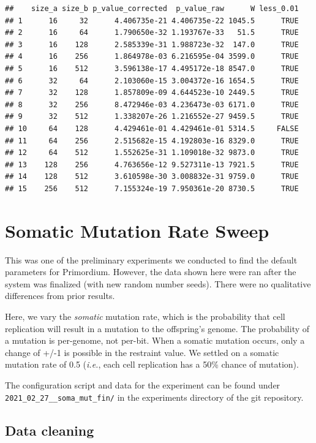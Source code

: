 \documentclass[
]{book}
\begin{document}
\begin{verbatim}
##    size_a size_b p_value_corrected  p_value_raw      W less_0.01
## 1      16     32      4.406735e-21 4.406735e-22 1045.5      TRUE
## 2      16     64      1.790650e-32 1.193767e-33   51.5      TRUE
## 3      16    128      2.585339e-31 1.988723e-32  147.0      TRUE
## 4      16    256      1.864978e-03 6.216595e-04 3599.0      TRUE
## 5      16    512      3.596138e-17 4.495172e-18 8547.0      TRUE
## 6      32     64      2.103060e-15 3.004372e-16 1654.5      TRUE
## 7      32    128      1.857809e-09 4.644523e-10 2449.5      TRUE
## 8      32    256      8.472946e-03 4.236473e-03 6171.0      TRUE
## 9      32    512      1.338207e-26 1.216552e-27 9459.5      TRUE
## 10     64    128      4.429461e-01 4.429461e-01 5314.5     FALSE
## 11     64    256      2.515682e-15 4.192803e-16 8329.0      TRUE
## 12     64    512      1.552625e-31 1.109018e-32 9873.0      TRUE
## 13    128    256      4.763656e-12 9.527311e-13 7921.5      TRUE
## 14    128    512      3.610598e-30 3.008832e-31 9759.0      TRUE
## 15    256    512      7.155324e-19 7.950361e-20 8730.5      TRUE
\end{verbatim}

\hypertarget{somatic-mutation-rate-sweep}{%
\chapter{Somatic Mutation Rate Sweep}\label{somatic-mutation-rate-sweep}}

This was one of the preliminary experiments we conducted to find the default parameters for Primordium.
However, the data shown here were ran after the system was finalized (with new random number seeds).
There were no qualitative differences from prior results.

Here, we vary the \emph{somatic} mutation rate, which is the probability that cell replication will result in a mutation to the offspring's genome.
The probability of a mutation is per-genome, not per-bit.
When a somatic mutation occurs, only a change of +/-1 is possible in the restraint value.
We settled on a somatic mutation rate of 0.5 (\emph{i.e.}, each cell replication has a 50\% chance of mutation).

The configuration script and data for the experiment can be found under \texttt{2021\_02\_27\_\_soma\_mut\_fin/} in the experiments directory of the git repository.

\hypertarget{data-cleaning-1}{%
\section{Data cleaning}\label{data-cleaning-1}}
\end{document}
